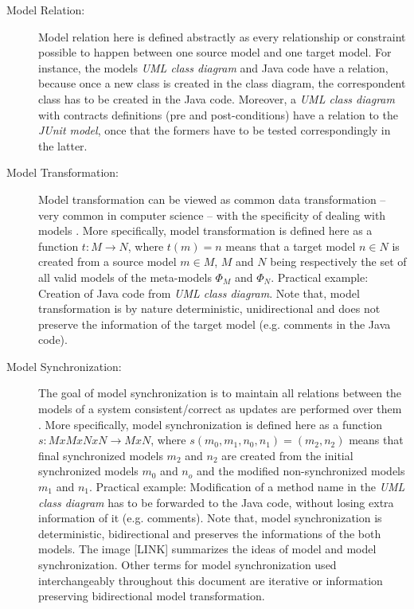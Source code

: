\documentclass[tuberlin,cic,tc,openright,english,noabntcite]{iiufrgs}
\begin{document}
\begin{description}
\item[Model Relation:] Model relation here is defined abstractly as every relationship or constraint possible to happen between one source model and one target model. For instance, the models \emph{UML class diagram} and Java code have a relation, because once a new class is created in the class diagram, the correspondent class has to be created in the Java code. Moreover, a \emph{UML class diagram} with contracts definitions (pre and post-conditions) have a relation to the \emph{JUnit model}, once that the formers have to be tested correspondingly in the latter.

\item[Model Transformation:] Model transformation can be viewed as common data transformation – very common in computer science – with the specificity of dealing with models \cite{czarnecki2006feature}. More specifically, model transformation is defined here as a function $t : M \rightarrow N$, where $t(m) = n$ means that a target model $n \in N$ is created from a source model $m \in M$, $M$ and $N$ being respectively the set of all valid models of the meta-models $\Phi_M$ and $\Phi_N$. Practical example: Creation of Java code from \emph{UML class diagram}. Note that, model transformation is by nature deterministic, unidirectional and does not preserve the information of the target model (e.g. comments in the Java code).

\item[Model Synchronization:] The goal of model synchronization is to maintain all relations between the models of a system consistent/correct as updates are performed over them \cite{diskin2011model}. More specifically, model synchronization is defined here as a function $s : M x M x N x N \rightarrow M x N $, where $s(m_0,m_1,n_0,n_1) = (m_2,n_2)$ means that final synchronized models $m_2$ and $n_2$ are created from the initial synchronized models $m_0$ and $n_o$ and the modified non-synchronized models $m_1$ and $n_1$. Practical example: Modification of a method name in the \emph{UML class diagram} has to be forwarded to the Java code, without losing extra information of it (e.g. comments). Note that, model synchronization is deterministic, bidirectional and preserves the informations of the both models. The image [LINK] summarizes the ideas of model and model synchronization. Other terms for model synchronization used interchangeably throughout this document are iterative or information preserving bidirectional model transformation.


\end{description}
\end{document}
